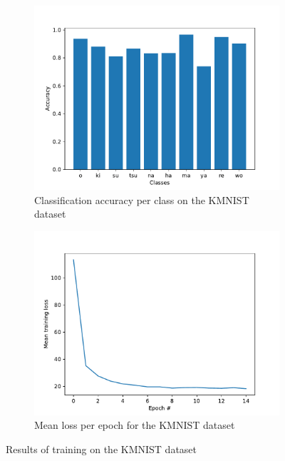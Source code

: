 \documentclass[11pt]{article}
\begin{document}
 \begin{figure}
     \begin{subfigure}{0.49\textwidth}
         \includegraphics[width=\linewidth]{Dataset.KMNIST_classification_accuracy}
        \caption{Classification accuracy per class on the KMNIST dataset}
     \end{subfigure}
     \begin{subfigure}{0.49\textwidth}
         \includegraphics[width=\linewidth]{Dataset.KMNIST_training_loss}
         \caption{Mean loss per epoch for the KMNIST dataset}
     \end{subfigure}
    \caption{Results of training on the KMNIST dataset}
    \label{fig:kmnist_results}
\end{figure}
\end{document}
